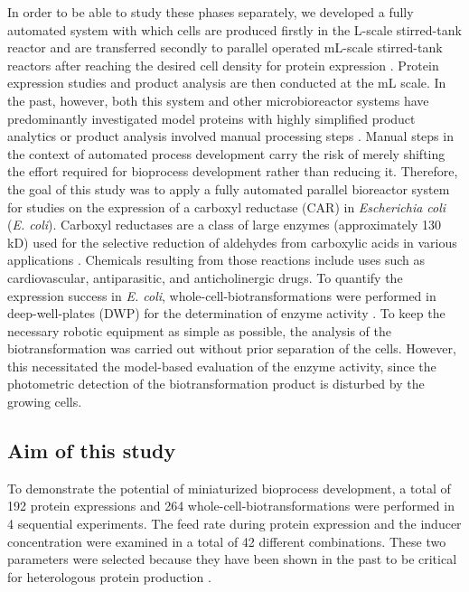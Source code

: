 \documentclass[sn-standardnature]{sn-jnl}%
\theoremstyle{thmstyleone}%
\theoremstyle{thmstyletwo}%
\theoremstyle{thmstylethree}%
\begin{document}
In order to be able to study these phases separately, we developed a fully automated system with which cells are produced firstly in the L-scale stirred-tank reactor and are transferred secondly to parallel operated mL-scale stirred-tank reactors after reaching the desired cell density for protein expression \cite{von2021automated}.
Protein expression studies and product analysis are then conducted at the mL scale.
In the past, however, both this system and other microbioreactor systems have predominantly investigated model proteins with highly simplified product analytics \cite{schmideder2017high,von2021automated,huber2009robo} or product analysis involved manual processing steps \cite{haby2019integrated}.
Manual steps in the context of automated process development carry the risk of merely shifting the effort required for bioprocess development rather than reducing it.
Therefore, the goal of this study was to apply a fully automated parallel bioreactor system for studies on the expression of a carboxyl reductase (CAR) in \textit{Escherichia coli} (\textit{E. coli}).
Carboxyl reductases are a class of large enzymes (approximately 130 kD) used for the selective reduction of aldehydes from carboxylic acids in various applications \cite{weber2021production}.
Chemicals resulting from those reactions include uses such as cardiovascular, antiparasitic, and anticholinergic drugs\cite{erdmann2017enzymatic,weber2021production,ruff2012biocatalytic}.
To quantify the expression success in \textit{E. coli}, whole-cell-biotransformations were performed in deep-well-plates (DWP) for the determination of enzyme activity \cite{schwendenwein2019random}.
To keep the necessary robotic equipment as simple as possible, the analysis of the biotransformation was carried out without prior separation of the cells.
However, this necessitated the model-based evaluation of the enzyme activity, since the photometric detection of the biotransformation product is disturbed by the growing cells.

\subsection{Aim of this study}
\label{sec_intro_aim}

To demonstrate the potential of miniaturized bioprocess development, a total of 192 protein expressions and 264 whole-cell-biotransformations were performed in 4 sequential experiments.
The feed rate during protein expression and the inducer concentration were examined in a total of 42 different combinations.
These two parameters were selected because they have been shown in the past to be critical for heterologous protein production \cite{neubauer2001expression,von2021automated}.
\end{document}
